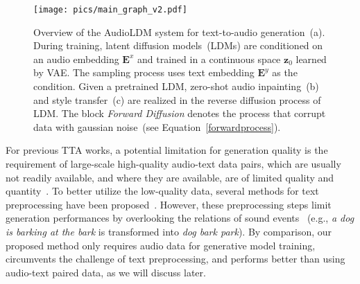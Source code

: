 \documentclass{article}
\begin{document}
\begin{figure*}
    \centerline{
    \texttt{[image: pics/main\_graph\_v2.pdf]}}
    \caption{Overview of the AudioLDM system for text-to-audio generation~(a). During training, latent diffusion models~(LDMs) are conditioned on an audio embedding $\boldsymbol{E}^{x}$ and trained in a continuous space $\boldsymbol{z}_{0}$ learned by VAE. The sampling process uses text embedding $\boldsymbol{E}^{y}$ as the condition. Given a pretrained LDM, zero-shot audio inpainting~(b) and style transfer~(c) are realized in the reverse diffusion process of LDM. The block \textit{Forward Diffusion} denotes the process that corrupt data with gaussian noise~(see Equation~\ref{forwardprocess}).}
    \label{fig:overalldesign}
\end{figure*}

For previous TTA works, a potential limitation for generation quality is the requirement of large-scale high-quality audio-text data pairs, which are usually not readily available, and where they are available, are  
of limited quality and quantity~\cite{liu2022separate}. To better utilize the low-quality data, several methods for text preprocessing have been proposed~\cite{kreuk2022audiogen, yang2022diffsound}. However, these preprocessing steps limit generation performances by overlooking the relations of sound events~
(e.g., \textit{a dog is barking at the bark} is transformed into \textit{dog bark park}).
By comparison, our proposed method only requires audio data for generative model training, circumvents the challenge of text preprocessing, and performs better than using audio-text paired data, as we will discuss later.  
\end{document}
